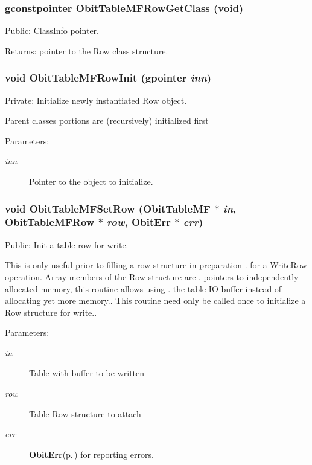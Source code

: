 \subsubsection{\setlength{\rightskip}{0pt plus 5cm}gconstpointer Obit\-Table\-MFRow\-Get\-Class (void)}\label{ObitTableMF_8c_a15}


Public: Class\-Info pointer. 

\begin{Desc}
\item[Returns:]pointer to the Row class structure. \end{Desc}
\subsubsection{\setlength{\rightskip}{0pt plus 5cm}void Obit\-Table\-MFRow\-Init (gpointer {\em inn})}\label{ObitTableMF_8c_a6}


Private: Initialize newly instantiated Row object. 

Parent classes portions are (recursively) initialized first \begin{Desc}
\item[Parameters:]
\begin{description}
\item[{\em inn}]Pointer to the object to initialize. \end{description}
\end{Desc}
\subsubsection{\setlength{\rightskip}{0pt plus 5cm}void Obit\-Table\-MFSet\-Row ({\bf Obit\-Table\-MF} $\ast$ {\em in}, {\bf Obit\-Table\-MFRow} $\ast$ {\em row}, {\bf Obit\-Err} $\ast$ {\em err})}\label{ObitTableMF_8c_a23}


Public: Init a table row for write. 

This is only useful prior to filling a row structure in preparation . for a Write\-Row operation. Array members of the Row structure are . pointers to independently allocated memory, this routine allows using . the table IO buffer instead of allocating yet more memory.. This routine need only be called once to initialize a Row structure for write.. \begin{Desc}
\item[Parameters:]
\begin{description}
\item[{\em in}]Table with buffer to be written \item[{\em row}]Table Row structure to attach \item[{\em err}]{\bf Obit\-Err}{\rm (p.\,\pageref{structObitErr})} for reporting errors. \end{description}
\end{Desc}
